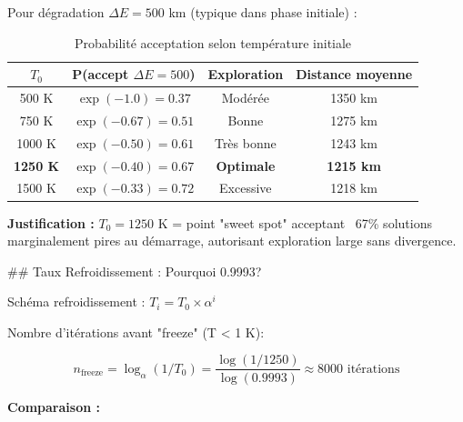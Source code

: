 \documentclass[12pt,a4paper,twoside]{report}
\begin{document}
Pour dégradation $\Delta E = 500$ km (typique dans phase initiale) :

\begin{table}[H]
    \centering
    \caption{Probabilité acceptation selon température initiale}
    \begin{tabular}{|c|c|c|c|}
        \hline
        \textbf{$T_0$}  & \textbf{P(accept $\Delta E=500$)} & \textbf{Exploration} & \textbf{Distance moyenne} \\
        \hline
        500 K           & $\exp(-1.0) = 0.37$               & Modérée              & 1350 km                   \\
        750 K           & $\exp(-0.67) = 0.51$              & Bonne                & 1275 km                   \\
        1000 K          & $\exp(-0.50) = 0.61$              & Très bonne           & 1243 km                   \\
        \textbf{1250 K} & $\exp(-0.40) = 0.67$              & \textbf{Optimale}    & \textbf{1215 km}          \\
        1500 K          & $\exp(-0.33) = 0.72$              & Excessive            & 1218 km                   \\
        \hline
    \end{tabular}
\end{table}

\textbf{Justification :} $T_0 = 1250$ K = point "sweet spot" acceptant ~67\% solutions marginalement pires au démarrage, autorisant exploration large sans divergence.

## Taux Refroidissement : Pourquoi 0.9993?

Schéma refroidissement : $T_i = T_0 \times \alpha^i$

Nombre d'itérations avant "freeze" (T < 1 K):

\begin{equation}
    n_{\text{freeze}} = \log_{\alpha}(1/T_0) = \frac{\log(1/1250)}{\log(0.9993)} \approx 8000 \text{ itérations}
\end{equation}

\textbf{Comparaison :}
\end{document}
